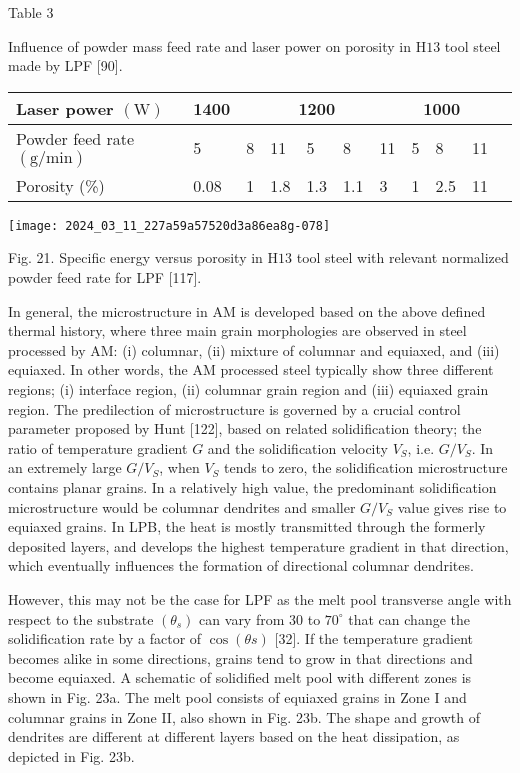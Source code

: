 \documentclass[10pt]{article}
\begin{document}
Table 3

Influence of powder mass feed rate and laser power on porosity in $\mathrm{H} 13$ tool steel made by LPF [90].

\begin{center}
\begin{tabular}{lllllllllll}
\hline
Laser power $(\mathrm{W})$ & 1400 &  & \multicolumn{3}{c}{1200} & \multicolumn{5}{c}{1000} \\
\hline
Powder feed rate $(\mathrm{g} / \mathrm{min})$ & 5 & 8 & 11 & 5 & 8 & 11 & 5 & 8 & 11 &  \\
Porosity (\%) & 0.08 & 1 & 1.8 & 1.3 & 1.1 & 3 & 1 & 2.5 & 11 &  \\
\end{tabular}
\end{center}

\begin{center}
\texttt{[image: 2024\_03\_11\_227a59a57520d3a86ea8g-078]}
\end{center}

Fig. 21. Specific energy versus porosity in $\mathrm{H} 13$ tool steel with relevant normalized powder feed rate for LPF [117].

In general, the microstructure in AM is developed based on the above defined thermal history, where three main grain morphologies are observed in steel processed by AM: (i) columnar, (ii) mixture of columnar and equiaxed, and (iii) equiaxed. In other words, the AM processed steel typically show three different regions; (i) interface region, (ii) columnar grain region and (iii) equiaxed grain region. The predilection of microstructure is governed by a crucial control parameter proposed by Hunt [122], based on related solidification theory; the ratio of temperature gradient $G$ and the solidification velocity $V_{S}$, i.e. $G / V_{S}$. In an extremely large $G / V_{S}$, when $V_{S}$ tends to zero, the solidification microstructure contains planar grains. In a relatively high value, the predominant solidification microstructure would be columnar dendrites and smaller $G / V_{S}$ value gives rise to equiaxed grains. In LPB, the heat is mostly transmitted through the formerly deposited layers, and develops the highest temperature gradient in that direction, which eventually influences the formation of directional columnar dendrites.

However, this may not be the case for LPF as the melt pool transverse angle with respect to the substrate $\left(\theta_{s}\right)$ can vary from 30 to $70^{\circ}$ that can change the solidification rate by a factor of $\cos (\theta s)$ [32]. If the temperature gradient becomes alike in some directions, grains tend to grow in that directions and become equiaxed. A schematic of solidified melt pool with different zones is shown in Fig. 23a. The melt pool consists of equiaxed grains in Zone I and columnar grains in Zone II, also shown in Fig. 23b. The shape and growth of dendrites are different at different layers based on the heat dissipation, as depicted in Fig. 23b.
\end{document}
